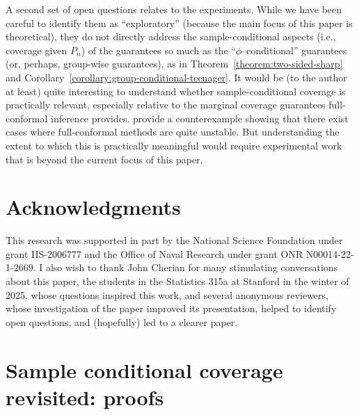 \documentclass{article}
\begin{document}
A second set of open questions relates to the experiments.
%
While we have been careful to identify them as ``exploratory'' (because the
main focus of this paper is theoretical), they do not directly address the
sample-conditional aspects (i.e., coverage given $P_n$) of the guarantees so
much as the ``$\phi$--conditional'' guarantees (or, perhaps, group-wise
guarantees), as in Theorem~\ref{theorem:two-sided-sharp} and
Corollary~\ref{corollary:group-conditional-teenager}.
%
It would be (to the author at least) quite interesting to understand whether
sample-conditional coverage is practically relevant,
especially relative to the marginal coverage guarantees full-conformal inference provides.
%
\citet{BianBa22} provide a counterexample showing that there exist cases
where full-conformal methods are quite unstable.
%
But understanding the extent to which this is practically meaningful would
require experimental work that is beyond the current focus of this
paper.

\section*{Acknowledgments}

This research was supported in part by the National Science Foundation under
grant IIS-2006777 and the Office of Naval Research under grant ONR
N00014-22-1-2669.
%
I also wish to thank John Cherian for many stimulating conversations about
this paper, the students in the Statistics 315a at Stanford in the winter of
2025, whose questions inspired this work, and several anonymous reviewers,
whose investigation of the paper improved its presentation, helped to
identify open questions, and (hopefully) led to a clearer paper.




\newpage

\appendix

\section{Sample conditional coverage revisited: proofs}
\label{sec:revisiting-conditional-coverage}
\end{document}
